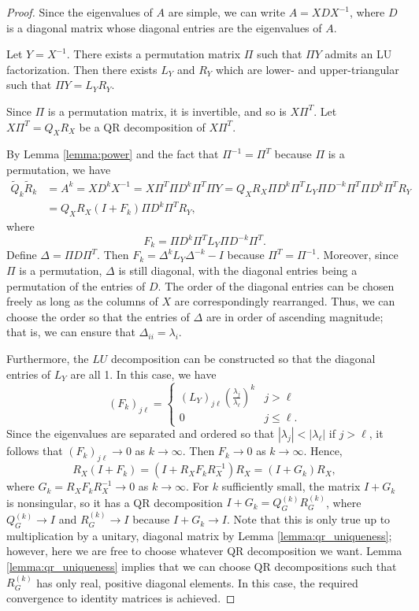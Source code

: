 \documentclass{article}
\newcommand{\Qt}{\widetilde{Q}}
\newcommand{\Rt}{\widetilde{R}}
\begin{document}
\begin{proof}
	Since the eigenvalues of $A$ are simple, we can write $A = XDX^{-1}$, where $D$ is a diagonal matrix whose diagonal entries are the eigenvalues of $A$.
	
	Let $Y = X^{-1}$. There exists a permutation matrix $\Pi$ such that $\Pi Y$ admits an LU factorization. Then there exists $L_Y$ and $R_Y$ which are lower- and upper-triangular such that $\Pi Y = L_YR_Y$. 
	
	Since $\Pi$ is a permutation matrix, it is invertible, and so is $X\Pi^T$. Let $X\Pi^T = Q_XR_X$ be a QR decomposition of $X\Pi^T$.
	
	By Lemma \ref{lemma:power} and the fact that $\Pi^{-1} = \Pi^T$ because $\Pi$ is a permutation, we have
	\begin{align*}
		\Qt_k\Rt_k &= A^k = XD^kX^{-1} = X\Pi^T \Pi D^k \Pi^T\Pi Y = Q_XR_X\Pi D^k\Pi^T L_Y\Pi D^{-k}\Pi^T\Pi D^k\Pi^TR_Y \\
		&= Q_XR_X(I+F_k)\Pi D^k\Pi^T R_Y,
	\end{align*}
	where
	\begin{equation*}
		F_k = \Pi D^k\Pi^TL_Y \Pi D^{-k}\Pi^T.
	\end{equation*}
	Define $\Delta = \Pi D \Pi^T$. Then $F_k = \Delta^k L_Y\Delta^{-k} - I$ because $\Pi^T = \Pi^{-1}$. Moreover, since $\Pi$ is a permutation, $\Delta$ is still diagonal, with the diagonal entries being a permutation of the entries of $D$. The order of the diagonal entries can be chosen freely as long as the columns of $X$ are correspondingly rearranged. Thus, we can choose the order so that the entries of $\Delta$ are in order of ascending magnitude; that is, we can ensure that $\Delta_{ii} = \lambda_i$.
	
	Furthermore, the $LU$ decomposition can be constructed so that the diagonal entries of $L_Y$ are all 1. In this case, we have
	\begin{equation*}
		(F_k)_{j\ell} = \begin{cases}
			(L_Y)_{j\ell}\left(\frac{\lambda_j}{\lambda_\ell}\right)^k & j > \ell \\
			0 & j \le \ell.
		\end{cases}
	\end{equation*}
	Since the eigenvalues are separated and ordered so that $|\lambda_j| < |\lambda_\ell|$ if $j >\ell$, it follows that $(F_k)_{j\ell} \to 0$ as $k \to\infty$. Then $F_k \to 0$ as $k \to \infty$. Hence,
	\begin{equation*}
		R_X(I+F_k) = (I+R_XF_kR_X^{-1})R_X = (I+G_k)R_X,
	\end{equation*}
	where $G_k = R_XF_kR_X^{-1} \to 0$ as $k \to \infty$. For $k$ sufficiently small, the matrix $I + G_k$ is nonsingular, so it has a QR decomposition $I + G_k = Q_G^{(k)}R_G^{(k)}$, where $Q_G^{(k)}\to I$ and $R_G^{(k)} \to I$ because $I+G_k \to I$. Note that this is only true up to multiplication by a unitary, diagonal matrix by Lemma \ref{lemma:qr_uniqueness}; however, here we are free to choose whatever QR decomposition we want. Lemma \ref{lemma:qr_uniqueness} implies that we can choose QR decompositions such that $R_G^{(k)}$ has only real, positive diagonal elements. In this case, the required convergence to identity matrices is achieved.
	

\end{proof}
\end{document}
